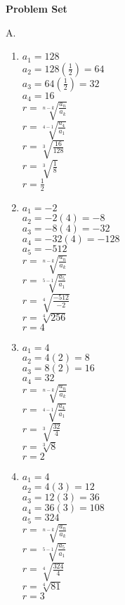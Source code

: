 \textbf{Problem Set}

\vspce
\begin{multicols}{2}
A. %
\begin{enumerate}[label = \arabic*. ]


	\item %
$a_1=128$\\
$a_2=128\left(\displaystyle \frac{1}{2} \right) =64$\\
$a_3=64\left(\displaystyle \frac{1}{2} \right) =32$\\
$a_4=16$\\

$r=\sqrt[n-k]{\displaystyle \frac{a_n}{a_k}} $\\
$r=\sqrt[4-1]{\displaystyle \frac{a_4}{a_1}} $\\
$r=\sqrt[3]{\displaystyle \frac{16}{128}} $\\
$r=\sqrt[3]{\displaystyle \frac{1}{8}} $\\
$r=\displaystyle \frac{1}{2}$

	\item%
$a_1=-2$\\
$a_2=-2(4)=-8$\\
$a_3=-8(4)=-32$\\
$a_4=-32(4)=-128$\\
$a_5=-512$\\
$r=\sqrt[n-k]{\displaystyle \frac{a_n}{a_k}} $\\
$r=\sqrt[5-1]{\displaystyle \frac{a_5}{a_1}} $\\
$r=\sqrt[4]{\displaystyle \frac{-512}{-2}} $\\
$r=\sqrt[4]{256} $\\
$r=4 $

	\item%
$a_1=4$\\
$a_2=4(2)=8$\\
$a_3=8(2)=16$\\
$a_4=32$\\

$r=\sqrt[n-k]{\displaystyle \frac{a_n}{a_k}} $\\
$r=\sqrt[4-1]{\displaystyle \frac{a_4}{a_1}} $\\
$r=\sqrt[3]{\displaystyle \frac{32}{4}} $\\
$r=\sqrt[3]{8} $\\
$r=2 $

	\item %
$a_1=4$\\
$a_2=4(3)=12$\\
$a_3=12(3)=36$\\
$a_4=36(3)=108$\\
$a_5=324$\\
$r=\sqrt[n-k]{\displaystyle \frac{a_n}{a_k}} $\\
$r=\sqrt[5-1]{\displaystyle \frac{a_5}{a_1}} $\\
$r=\sqrt[4]{\displaystyle \frac{324}{4}} $\\
$r=\sqrt[4]{81} $\\
$r=3 $


\end{enumerate}
\end{multicols}
